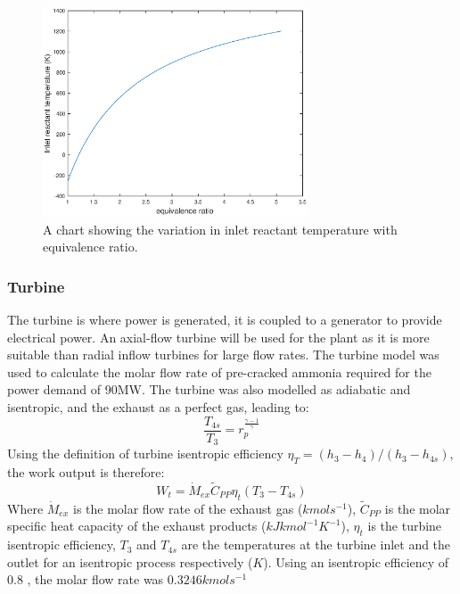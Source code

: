 \begin{figure} [h]
\centering
\includegraphics[width=0.7\textwidth]{./pictures/combustor.eps}
  \caption{A chart showing the variation in inlet reactant temperature with equivalence ratio.} \label{fig:flametemp}
  \end{figure} 

\subsubsection{Turbine} \label{ssec:turbine}
The turbine is where power is generated, it is coupled to a generator to provide electrical power. An axial-flow turbine will be used for the plant as it is more suitable than radial inflow turbines for large flow rates. The turbine model was used to calculate the molar flow rate of pre-cracked ammonia required for the power demand of 90MW. The turbine was also modelled as adiabatic and isentropic, and the exhaust as a perfect gas, leading to: 
\begin{equation}
\frac{T_{4s}}{T_{3}} = r_p^{\frac{\gamma -1}{\gamma}}
\end{equation}
Using the definition of turbine isentropic efficiency $\eta_T = (h_3 - h_4)/(h_3 - h_{4s})$, the work output is therefore:
\begin{equation}
W_t = \dot{M}_{ex} \tilde{C}_{PP} \eta_t  (T_3 - T_{4s})
\end{equation}
Where $\dot{M}_{ex}$ is the molar flow rate of the exhaust gas ($kmol s^{-1}$), $\tilde{C}_{PP}$ is the molar specific heat capacity of the exhaust products ($kJ kmol^{-1} K^{-1}$), $\eta_t$ is the turbine isentropic efficiency, $T_3$ and $T_{4s}$ are the temperatures at the turbine inlet and the outlet for an isentropic process respectively ($K$). Using an isentropic efficiency of 0.8 \cite{boyce}, the molar flow rate was $0.3246kmol s^{-1}$

